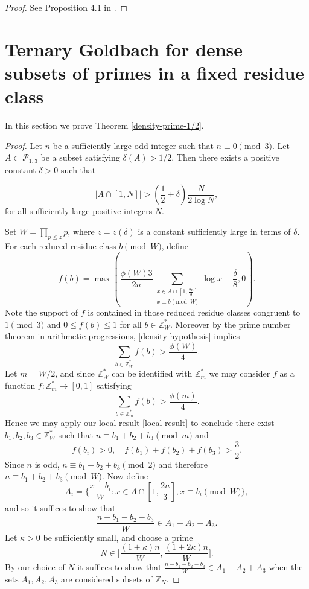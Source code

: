 \documentclass[a4paper,11pt,twoside]{amsart}
\theoremstyle{definition}
\numberwithin{equation}{section}
\newcommand\Z{\mathbb{Z}}
\newcommand{\CP}{\mathcal{P}}
\newcommand{\vdelta}{\underline{\delta}}
\begin{document}
\begin{proof}
    See Proposition 4.1 in \cite{Shao}.
\end{proof}


\section{Ternary Goldbach for dense subsets of primes in a fixed residue class}\label{sec5}

In this section we prove Theorem \ref{density-prime-1/2}.

\begin{proof}
Let $n$ be a sufficiently large odd integer such that $n \equiv 0 \pmod 3$. Let $A \subset \CP_{1,3}$ be a subset satisfying $\vdelta(A) > 1/2$. Then there exists a positive constant $\delta > 0$ such that 

\begin{equation}\label{density hypothesis} |A \cap [1,N]| > (\frac{1}{2} + \delta)\frac{N}{2\log N},
\end{equation} for all sufficiently large positive integers $N.$

 Set $W = \prod_{p \leq z}p$, where $z = z(\delta)$ is a constant sufficiently large in terms of $\delta$. 
For each reduced residue class $b \pmod{W}$, define $$f(b) = \max(\frac{\phi(W)3}{2n}\sum_{\substack{x \in A \cap [1,\frac{2n}{3}] \\ x \equiv b \pmod{W}}} \log x - \frac{\delta}{8},0).$$ Note the support of $f$ is contained in those reduced residue classes congruent to $1 \pmod{3}$ and $0 \leq f(b) \leq 1$ for all $b \in \Z_W^*.$ Moreover by the prime number theorem in arithmetic progressions, \eqref{density hypothesis} implies $$\sum_{b \in \Z_W^*}f(b) > \frac{\phi(W)}{4}.$$ Let $m = W/2$, and since $\Z_W^*$ can be identified with $\Z_m^*$ we may consider $f$ as a function $f : \Z_m^* \rightarrow [0,1]$ satisfying $$\sum_{b \in \Z_m^*}f(b) > \frac{\phi(m)}{4}.$$ Hence we may apply our local result \ref{local-result} to conclude there exist $b_1,b_2,b_3 \in \Z_W^*$ such that $n \equiv b_1 + b_2 + b_3 \pmod{m}$ and \begin{equation}
    f(b_i) > 0, \quad  f(b_1) + f(b_2) + f(b_3) > \frac{3}{2}.
\end{equation} Since $n$ is odd, $n \equiv b_1 + b_2 + b_3 \pmod{2}$ and therefore $n \equiv b_1 + b_2 + b_3 \pmod{W}.$ Now define $$A_i = \{\frac{x - b_i}{W} : x \in A \cap [1,\frac{2n}{3}], x \equiv b_i \pmod W    \},$$ and so it suffices to show that $$\frac{n - b_1 - b_2 - b_3}{W} \in A_1 + A_2 + A_3.$$ Let $\kappa > 0$ be sufficiently small, and choose a prime  $$N \in \Big[\frac{(1 + \kappa)n}{W},\frac{(1 + 2\kappa)n}{W}\Big].$$ By our choice of $N$ it suffices to show that $\frac{n - b_1 - b_2 - b_3}{W} \in A_1 + A_2 + A_3$ when the sets $A_1,A_2,A_3$ are considered subsets of $\Z_N.$


\end{proof}
\end{document}
